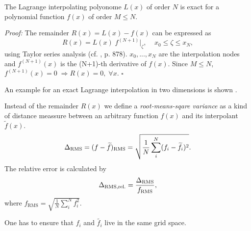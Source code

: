 The Lagrange interpolating polyonome $L(x)$ of order $N$ is exact for a
polynomial function $f(x)$ of order $M \le N$.

\emph{Proof:} The remainder $R(x) = L(x) - f(x)$ can be expressed as
\begin{equation}
    R(x) = L(x) \; f^{(N+1)}|_{\zeta}, \;\;\;\; x_0 \le \zeta \le x_N,
\end{equation}
using Taylor series analysis (cf. \cite{Abram1972}, p. 878). $x_0,...,x_N$ are
the interpolation nodes and $f^{(N+1)}(x)$ is the (N+1)-th derivative of $f(x)$.
Since $M \le N$, $f^{(N+1)}(x) = 0 \; \Rightarrow R(x) = 0,\; \forall x$. $\square$

An example for an exact Lagrange interpolation in two dimensions is shown
.

Instead of the remainder $R(x)$ we define a \emph{root-means-sqare
variance} as a kind of distance meassure between an arbitrary function $f(x)$ and
its interpolant $\widetilde{f}(x)$.
\begin{equation}
\label{eqn:error-rms}
    \Delta_{\text{RMS}} = (f - \widetilde{f})_{\text{RMS}} = \sqrt{\frac{1}{N} \sum^N_i (f_i - \widetilde{f_i})^2}.
\end{equation}
The relative error is calculated by
\begin{equation}
    \Delta_{\text{RMS,rel.}} = \frac{\Delta_{\text{RMS}}}{f_{\text{RMS}}},
\end{equation}
where $f_{\text{RMS}} = \sqrt{\frac{1}{N} \sum^N_i f^2_i}$. 

\remark One has to ensure that $f_i$ and $\widetilde{f_i}$ live in the same grid space.

% 
% 

